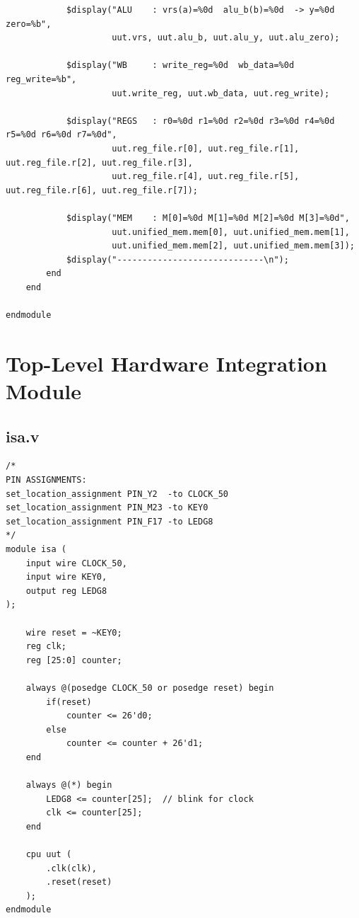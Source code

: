 \documentclass[12pt]{report}
\begin{document}
\begin{lstlisting}
            $display("ALU    : vrs(a)=%0d  alu_b(b)=%0d  -> y=%0d  zero=%b",
                     uut.vrs, uut.alu_b, uut.alu_y, uut.alu_zero);

            $display("WB     : write_reg=%0d  wb_data=%0d  reg_write=%b",
                     uut.write_reg, uut.wb_data, uut.reg_write);

            $display("REGS   : r0=%0d r1=%0d r2=%0d r3=%0d r4=%0d r5=%0d r6=%0d r7=%0d",
                     uut.reg_file.r[0], uut.reg_file.r[1], uut.reg_file.r[2], uut.reg_file.r[3],
                     uut.reg_file.r[4], uut.reg_file.r[5], uut.reg_file.r[6], uut.reg_file.r[7]);

            $display("MEM    : M[0]=%0d M[1]=%0d M[2]=%0d M[3]=%0d",
                     uut.unified_mem.mem[0], uut.unified_mem.mem[1],
                     uut.unified_mem.mem[2], uut.unified_mem.mem[3]);
            $display("-----------------------------\n");
        end
    end

endmodule

\end{lstlisting}

\section{Top-Level Hardware Integration Module}
\subsection*{isa.v}
\label{appendix:hardwaremodule}
\begin{lstlisting}
/*
PIN ASSIGNMENTS:
set_location_assignment PIN_Y2  -to CLOCK_50
set_location_assignment PIN_M23 -to KEY0
set_location_assignment PIN_F17 -to LEDG8
*/
module isa (
    input wire CLOCK_50,
    input wire KEY0,
    output reg LEDG8
);

	wire reset = ~KEY0;
	reg clk;
	reg [25:0] counter;
	
	always @(posedge CLOCK_50 or posedge reset) begin
		if(reset)
			counter <= 26'd0;
		else
			counter <= counter + 26'd1;
	end
	
	always @(*) begin
		LEDG8 <= counter[25];  // blink for clock
		clk <= counter[25];
	end
	
	cpu uut (
		.clk(clk),
		.reset(reset)
	);
endmodule
\end{lstlisting}
\end{document}
